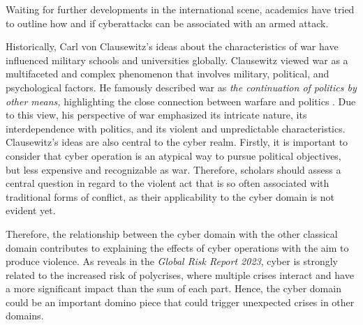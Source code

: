 Waiting for further developments in the international scene, academics have tried to outline how and if cyberattacks can be associated with an armed attack.

Historically, Carl von Clausewitz’s ideas about the characteristics of war have influenced military schools and universities globally. Clausewitz viewed war as a multifaceted and complex phenomenon that involves military, political, and psychological factors. He famously described war as \textit{the continuation of politics by other means,} highlighting the close connection between warfare and politics  \autocite{carlvonclausewitz_1984_on}. Due to this view, his perspective of war emphasized its intricate nature, its interdependence with politics, and its violent and unpredictable characteristics. Clausewitz’s ideas are also central to the cyber realm. Firstly, it is important to consider that cyber operation is an atypical way to pursue political objectives, but less expensive and recognizable as war. Therefore, scholars should assess a central question in regard to the violent act that is so often associated with traditional forms of conflict, as their applicability to the cyber domain is not evident yet.

Therefore, the relationship between the cyber domain with the other classical domain contributes to explaining the effects of cyber operations with the aim to produce violence. As \textcite{worldeconomicforum_2023_the} reveals in the\textit{ Global Risk Report 2023}, cyber is strongly related to the increased risk of polycrises, where multiple crises interact and have a more significant impact than the sum of each part. Hence, the cyber domain could be an important domino piece that could trigger unexpected crises in other domains. 

